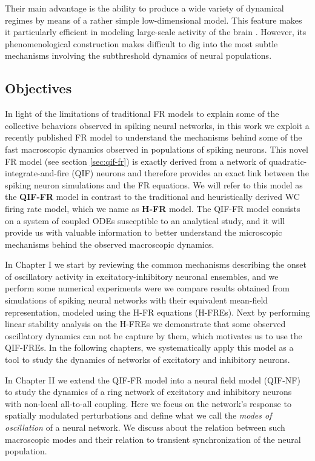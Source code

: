 Their main advantage is the ability to produce a wide variety of
dynamical regimes by means of a rather simple low-dimensional
model. This feature makes it particularly efficient in modeling
large-scale activity of the brain \citep{Deco2008}. However, its phenomenological 
construction makes difficult to dig into the most subtle mechanisms
involving the subthreshold dynamics of neural populations. 


\subsection*{Objectives}

In light of the limitations of traditional FR models to explain some
of the collective behaviors observed in spiking neural networks,  
in this work we exploit a recently published FR model \citep{Montbrio2015} to
understand the mechanisms behind some of the fast macroscopic dynamics
observed in populations of spiking neurons.
This novel FR model (see section \ref{sec:qif-fr}) is exactly derived from a network of
quadratic-integrate-and-fire (QIF) neurons and therefore provides an exact
link between the spiking neuron simulations and the FR equations. We
will refer to this model as the \textbf{QIF-FR} model in contrast to the
traditional and heuristically derived WC firing rate model, which we
name as \textbf{H-FR} model. The QIF-FR model consists on a system of
coupled ODEs susceptible to an analytical study, and it will
provide us with valuable information to better understand the
microscopic mechanisms behind the observed macroscopic dynamics. 

In Chapter I we start by reviewing the common mechanisms describing
the onset of oscillatory activity in excitatory-inhibitory neuronal
ensembles, and we perform
some numerical experiments were we compare results obtained from
simulations of spiking neural networks with 
their equivalent mean-field representation, modeled using the
H-FR equations (H-FREs). Next by performing linear
stability analysis on the H-FREs we demonstrate that some
observed oscillatory dynamics can not be capture by them, which
motivates us to use the QIF-FREs. In the following chapters, we
systematically apply this model as a tool  to study the dynamics
of networks of excitatory and inhibitory neurons.

In Chapter II we extend the QIF-FR model into a neural field model
(QIF-NF) to study the dynamics of a ring network of excitatory and
inhibitory neurons with non-local all-to-all coupling. Here we
focus on the network's response to spatially modulated perturbations 
and define what we call the \textit{modes of oscillation} of a neural
network. We discuss about the relation between such macroscopic modes
and their relation to transient synchronization of the neural
population.

